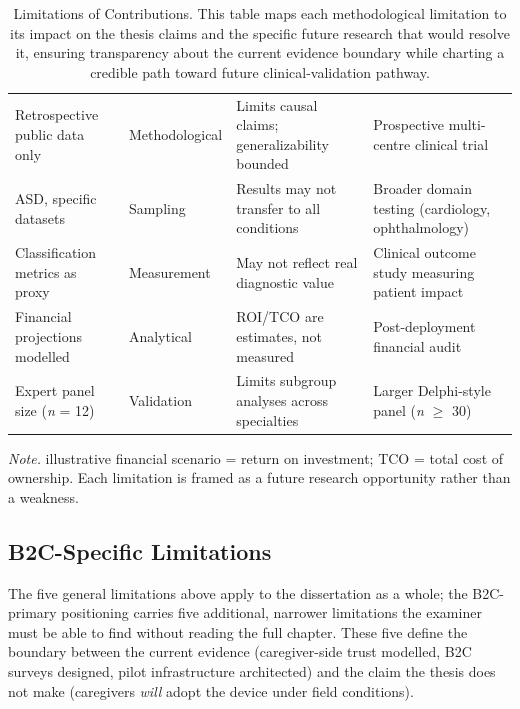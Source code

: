 

\begin{table}[H]
\tablestripes\tablefontsize
\tablefontsize
\caption[Limitations of Contributions]{Limitations of Contributions. This table maps each methodological limitation to its impact on the thesis claims and the specific future research that would resolve it, ensuring transparency about the current evidence boundary while charting a credible path toward future clinical-validation pathway.}
\begin{tabularx}{\textwidth}{@{} >{\raggedright\arraybackslash}p{2.0cm} >{\raggedright\arraybackslash}p{1.6cm} L L @{}}
\toprule
{} &  &  &  \\
\midrule
Retrospective public data only & Methodological & Limits causal claims; generalizability bounded & Prospective multi-centre clinical trial \\
\addlinespace
ASD, specific datasets & Sampling & Results may not transfer to all conditions & Broader domain testing (cardiology, ophthalmology) \\
\addlinespace
Classification metrics as proxy & Measurement & May not reflect real diagnostic value & Clinical outcome study measuring patient impact \\
\addlinespace
Financial projections modelled & Analytical & ROI/TCO are estimates, not measured & Post-deployment financial audit \\
\addlinespace
Expert panel size (\textit{n} = 12) & Validation & Limits subgroup analyses across specialties & Larger Delphi-style panel (\textit{n} $\geq$ 30) \\
\bottomrule
\end{tabularx}
\vspace{0.5em}\noindent\textit{Note.} illustrative financial scenario = return on investment; TCO = total cost of ownership. Each limitation is framed as a future research opportunity rather than a weakness.
\end{table}

\subsection{B2C-Specific Limitations}
\label{subsec:b2c_specific_limitations}

The five general limitations above apply to the dissertation as a whole; the B2C-primary positioning carries five additional, narrower limitations the examiner must be able to find without reading the full chapter. These five define the boundary between the current evidence (caregiver-side trust modelled, B2C surveys designed, pilot infrastructure architected) and the claim the thesis does not make (caregivers \emph{will} adopt the device under field conditions).

